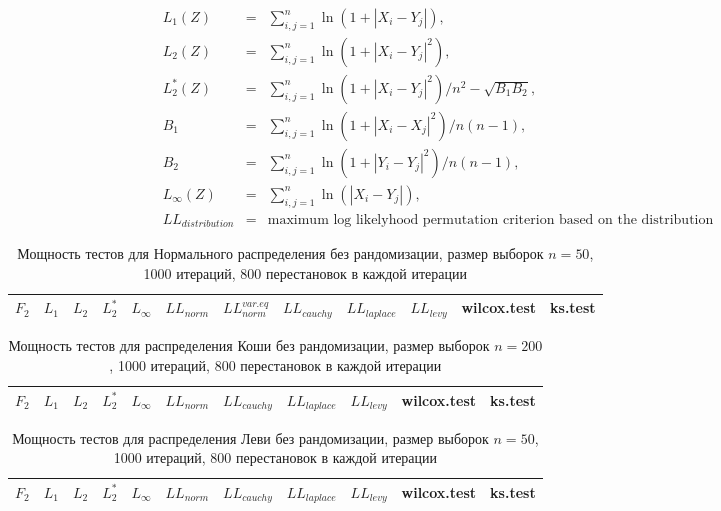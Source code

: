 \documentclass{article}
\begin{document}
\begin{eqnarray}
  L_1(Z)&=&\sum_{i,j=1}^{n}{\ln(1+|X_{i}-Y_{j}|)},\\
  L_2(Z)&=&\sum_{i,j=1}^{n}{\ln(1+|X_{i}-Y_{j}|^2)},\\
  L_2^*(Z)&=&\sum_{i,j=1}^{n}{\ln(1+|X_{i}-Y_{j}|^2)}/n^2-\sqrt{B_1 B_2},\\
  B_1 &=& \sum_{i,j=1}^{n}{\ln(1+|X_{i}-X_{j}|^2)}/n(n-1),\\
  B_2 &=& \sum_{i,j=1}^{n}{\ln(1+|Y_{i}-Y_{j}|^2)}/n(n-1),\\
  L_\infty(Z)&=&\sum_{i,j=1}^{n}{\ln(|X_{i}-Y_{j}|)},\\
  LL_{distribution} &=& \text{maximum log likelyhood permutation criterion based on the distribution}
\end{eqnarray}

\begin{longtable}{|c|c|c|c|c|c|c|c|c|c|c|c|}
  \caption{Мощность тестов для Нормального распределения без рандомизации, размер выборок $n=50$, 1000 итераций, 800 перестановок в каждой итерации}
  \label{table:n50} \\
  \hline
  $F_2$ & $L_{1}$ & $L_{2}$ & $L_2^*$ & $L_{\infty}$ & $LL_{norm}$ & $LL_{norm}^{var.eq}$ & $LL_{cauchy}$ & $LL_{laplace}$ & $LL_{levy}$ & wilcox.test & ks.test \\ \hline
  
\end{longtable}

\newpage

\begin{longtable}{|c|c|c|c|c|c|c|c|c|c|c|}
  \caption{Мощность тестов для распределения Коши без рандомизации, размер выборок $n=200$, 1000 итераций, 800 перестановок в каждой итерации}
  \label{table:n50} \\
  \hline
  $F_2$ & $L_{1}$ & $L_{2}$ & $L_2^*$ & $L_{\infty}$ & $LL_{norm}$ & $LL_{cauchy}$ & $LL_{laplace}$ & $LL_{levy}$ & wilcox.test & ks.test \\ \hline
  
\end{longtable}

\begin{longtable}{|c|c|c|c|c|c|c|c|c|c|c|}
  \caption{Мощность тестов для распределения Леви без рандомизации, размер выборок $n=50$, 1000 итераций, 800 перестановок в каждой итерации}
  \label{table:n50} \\
  \hline
  $F_2$ & $L_{1}$ & $L_{2}$ & $L_2^*$ & $L_{\infty}$ & $LL_{norm}$ & $LL_{cauchy}$ & $LL_{laplace}$ & $LL_{levy}$ & wilcox.test & ks.test \\ \hline
  
\end{longtable}
\end{document}
